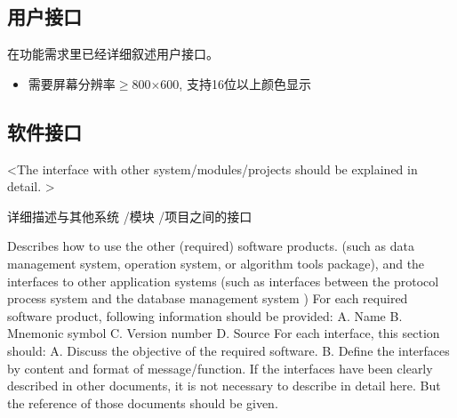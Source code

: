 \subsection{用户接口}
\iffalse
<The interface of the system with the User and vice versa should be explained in detail. >

详细描述系统与用户之间的接口

This section should include:
A. Features that must be supported by the software for eachman-machine interface. For example, if the user operates from a display terminal, then the following should be included:
		Screen format required
		Page layout and content of report and menu
		Timing sequence for input and output
		Usage of some functional key combinations
B. Every aspect about the use of the system's user interface. It could be a list that shows the user what should do and what should not do.  For example, an option of overlong or overshort message. . And same as other requirements, these requirements should be easily verified. For example, saying "A level 4 typist can finish function X in Z minutes after a one-hour training." instead of "A typist can finish function X"	

这应描述下述内容：

A. 对每种人机界面，软件所必须支持的特性。例如，如果系统用户通过一个显示终端进行操作，那么应包含下述内容：
要求的屏幕格式
页面规划及报告或菜单的内容
输入和输出的相关时序
一些组合功能键的用法

B. 与系统用户接口使用相关的所有方面。这可能只是一个简单的关于系统怎样展示给用户而该做什么和不该做什么的列表。例如提供关于长或短错误消息选项。和所有其它需求一样，这些需求也应能被检验，例如，四级打字员经一小时的培训后能在Z分钟内完成功能X，而不是一个打字员能完成功能X。
\fi
在功能需求里已经详细叙述用户接口。
\begin{itemize}
	\item 需要屏幕分辨率$\ge$800$\times$600, 支持16位以上颜色显示
\end{itemize}
\subsection{软件接口}
\iffalse
<The interface with other system/modules/projects should be explained in detail. >

详细描述与其他系统 /模块 /项目之间的接口

Describes how to use the other (required) software products. (such as data management system, operation system, or algorithm tools package), and the interfaces to other application systems (such as interfaces between the protocol process system and the database management system )
For each required software product, following information should be provided:
A. Name
B. Mnemonic symbol
C. Version number
D. Source
For each interface, this section should:
A. Discuss the objective of the required software.
B. Define the interfaces by content and format of message/function. If the interfaces have been clearly described in other documents, it is not necessary to describe in detail here. But the reference of those documents should be given.

